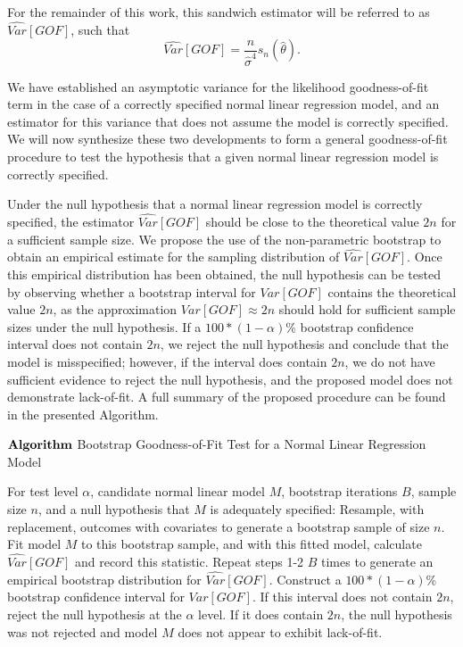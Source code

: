 \documentclass[12pt]{article} %
\theoremstyle{definition}
\begin{document}
		For the remainder of this work, this sandwich estimator will be referred to as $\widehat{Var}[GOF]$, such that
		\begin{equation*}
			\widehat{Var}[GOF] = \frac{n}{\hat{\sigma}^4} s_n(\hat{\theta}) .
		\end{equation*}

		We have established an asymptotic variance for the likelihood goodness-of-fit term in the case of a correctly specified normal linear regression model, and an
		estimator for this variance that does not assume the model is correctly specified. We will now synthesize these two developments to form a general goodness-of-fit procedure to
		test the hypothesis that a given normal linear regression model is correctly specified.

		Under the null hypothesis that a normal linear regression model is correctly specified, the estimator $\widehat{Var}[GOF]$ should be close to the theoretical value $2n$ for a
		sufficient sample size. We propose the use of the non-parametric bootstrap to obtain an empirical estimate for the sampling distribution of $\widehat{Var}[GOF]$. Once this empirical distribution
		has been obtained, the null hypothesis can be tested by observing whether a bootstrap interval for $Var[GOF]$ contains the theoretical value $2n$, as the approximation
		$Var[GOF] \approx 2n$ should hold for sufficient sample sizes under the null hypothesis. If a $100*(1-\alpha)$\% bootstrap confidence interval does not contain 
		$2n$, we reject the null hypothesis and conclude that the model is misspecified; however, if the interval does contain $2n$, we do not have sufficient evidence to reject
		the null hypothesis, and the proposed model does not demonstrate lack-of-fit. A full summary of the proposed procedure can be found in the presented Algorithm.
		\begin{algorithm*}[h]
			\caption*{$\bf{Algorithm}$ Bootstrap Goodness-of-Fit Test for a Normal Linear Regression Model}
			\begin{algorithmic}[1]
			  \Statex For test level $\alpha$, candidate normal linear model $M$, bootstrap iterations $B$, sample size $n$, and a null hypothesis that $M$
			  is adequately specified:
			  \State Resample, with replacement, outcomes with covariates to generate a bootstrap sample of size $n$.
			  \State Fit model $M$ to this bootstrap sample, and with this fitted model, calculate $\widehat{Var}[GOF]$
			  and record this statistic.
			  \State Repeat steps 1-2 $B$ times to generate an empirical bootstrap distribution for $\widehat{Var}[GOF]$.
			  \State Construct a $100*(1-\alpha)$\% bootstrap confidence interval for $Var[GOF]$.
			  \State If this interval does not contain $2n$, reject the null hypothesis at the $\alpha$ level. If it does contain
			  $2n$, the null hypothesis was not rejected and model $M$ does not appear to exhibit lack-of-fit. 
			\end{algorithmic}
		\end{algorithm*}
\end{document}
